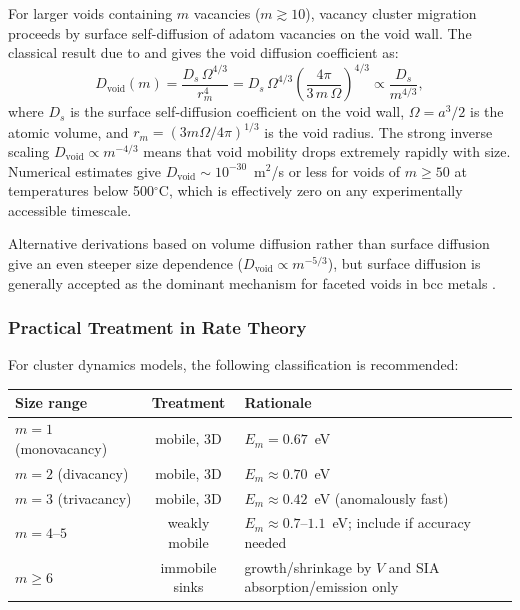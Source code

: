 \documentclass[pdflatex,sn-basic]{sn-jnl} %
\begin{document}
For larger voids containing $m$ vacancies ($m \gtrsim 10$), vacancy cluster
migration proceeds by surface self-diffusion of adatom vacancies on the void
wall. The classical result due to \cite{Gruber1967} and \cite{Nichols1969}
gives the void diffusion coefficient as:
\begin{equation}\label{eq:D_void}
    D_{\mathrm{void}}(m)
    = \frac{D_s\,\Omega^{4/3}}{r_m^4}
    = D_s\,\Omega^{4/3}\left(\frac{4\pi}{3\,m\,\Omega}\right)^{4/3}
    \propto \frac{D_s}{m^{4/3}},
\end{equation}
where $D_s$ is the surface self-diffusion coefficient on the void wall,
$\Omega = a^3/2$ is the atomic volume, and $r_m = (3m\Omega/4\pi)^{1/3}$ is
the void radius. The strong inverse scaling $D_{\mathrm{void}} \propto
m^{-4/3}$ means that void mobility drops extremely rapidly with size.
Numerical estimates give $D_{\mathrm{void}} \sim 10^{-30}$~m$^2$/s or less for
voids of $m \geq 50$ at temperatures below 500$^\circ$C, which is effectively
zero on any experimentally accessible timescale.

Alternative derivations based on volume diffusion rather than surface diffusion
give an even steeper size dependence ($D_{\mathrm{void}} \propto m^{-5/3}$),
but surface diffusion is generally accepted as the dominant mechanism for
faceted voids in bcc metals \citep{Nichols1969}.

\subsubsection{Practical Treatment in Rate Theory}

For cluster dynamics models, the following classification is recommended:

\begin{center}
\begin{tabular}{lcl}
\toprule
Size range & Treatment & Rationale \\
\midrule
$m = 1$ (monovacancy) & mobile, 3D & $E_m = 0.67$~eV \\
$m = 2$ (divacancy)    & mobile, 3D & $E_m \approx 0.70$~eV \\
$m = 3$ (trivacancy)   & mobile, 3D & $E_m \approx 0.42$~eV (anomalously fast) \\
$m = 4$--$5$           & weakly mobile & $E_m \approx 0.7$--$1.1$~eV; include if accuracy needed \\
$m \geq 6$             & immobile sinks & growth/shrinkage by $V$ and SIA absorption/emission only \\
\bottomrule
\end{tabular}
\end{center}
\end{document}
